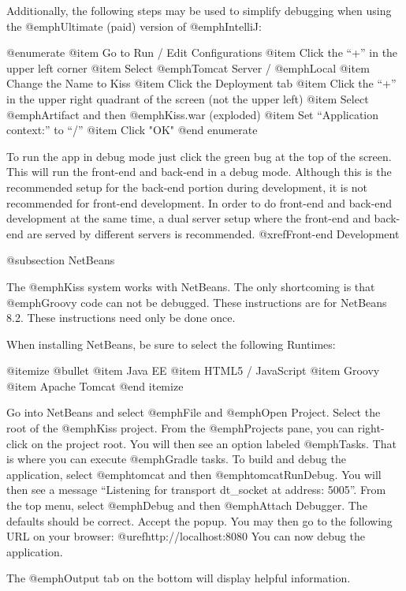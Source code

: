 Additionally, the following steps may be used to simplify debugging when using the @emph{Ultimate} (paid) version of @emph{IntelliJ}:



@enumerate
@item
Go to Run / Edit Configurations
@item
Click the ``+'' in the upper left corner
@item
Select @emph{Tomcat Server} / @emph{Local}
@item
Change the Name to Kiss
@item
Click the Deployment tab
@item
Click the ``+'' in the upper right quadrant of the screen (not the upper left)
@item
Select @emph{Artifact} and then @emph{Kiss.war} (exploded)
@item
Set ``Application context:'' to ``/''
@item
Click "OK"
@end enumerate

To run the app in debug mode just click the green bug at the top of the screen.  This will run the front-end and back-end 
in a debug mode.  Although this is the recommended setup for the back-end portion during development, it is not recommended
for front-end development.  In order to do front-end and back-end development at the same time, a dual server setup where
the front-end and back-end are served by different servers is recommended.    @xref{Front-end Development}

@subsection NetBeans

The @emph{Kiss} system works with NetBeans.  The only shortcoming is
that @emph{Groovy} code can not be debugged.  These instructions are
for NetBeans 8.2.  These instructions need only be done once.

When installing NetBeans, be sure to select the following Runtimes:

@itemize @bullet
@item
Java EE
@item
HTML5 / JavaScript
@item
Groovy
@item
Apache Tomcat
@end itemize

Go into NetBeans and select @emph{File} and @emph{Open Project}.
Select the root of the @emph{Kiss} project.  From the @emph{Projects}
pane, you can right-click on the project root.  You will then see an
option labeled @emph{Tasks}.  That is where you can execute
@emph{Gradle} tasks.  To build and debug the application, select
@emph{tomcat} and then @emph{tomcatRunDebug}.  You will then see a
message ``Listening for transport dt_socket at address: 5005''.  From
the top menu, select @emph{Debug} and then @emph{Attach Debugger}.
The defaults should be correct.  Accept the popup.  You may then go to
the following URL on your browser: @uref{http://localhost:8080}
You can now debug the application.

The @emph{Output} tab on the bottom will display helpful information.


